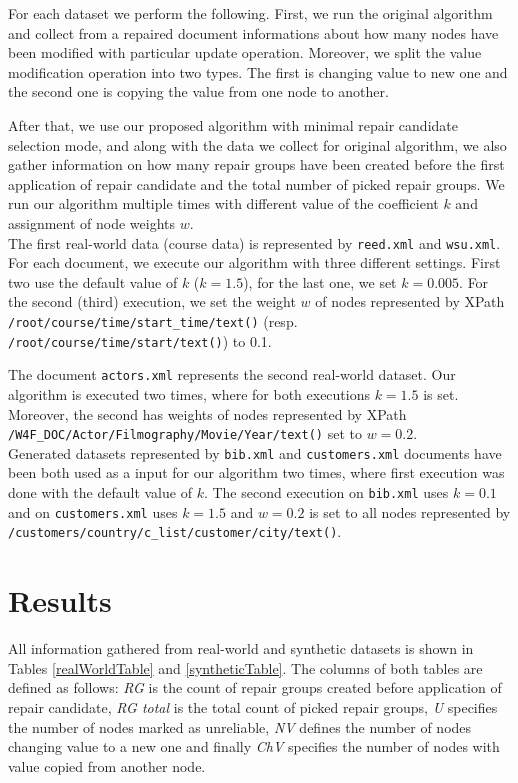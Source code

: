 For each dataset we perform the following. First, we run the original algorithm and collect from a repaired document informations about how many nodes have been modified with particular update operation. Moreover, we split the value modification operation into two types. The first is changing value to new one and the second one is copying the value from one node to another.

After that, we use our proposed algorithm with minimal repair candidate selection mode, and along with the data we collect for original algorithm, we also gather information on how many repair groups have been created before the first application of repair candidate and the total number of picked repair groups. We run our algorithm multiple times with different value of the coefficient $k$ and assignment of node weights $w$.\\

The first real-world data (course data) is represented by \texttt{reed.xml} and \texttt{wsu.xml}. For each document, we execute our algorithm with three different settings. First two use the default value of $k$ ($k=1.5$), for the last one, we set $k=0.005$. For the second (third) execution, we set the weight $w$ of nodes represented by XPath \texttt{/root/course/time/start\_time/text()} (resp. \texttt{/root/course/time/\discretionary{}{}{}start/text()}) to 0.1.

The document \texttt{actors.xml} represents the second real-world dataset. Our algorithm is executed two times, where for both executions $k=1.5$ is set. Moreover, the second has weights of nodes represented by XPath \texttt{/W4F\_DOC/\discretionary{}{}{}Actor/Filmography/Movie/Year/text()} set to $w=0.2$.\\

Generated datasets represented by \texttt{bib.xml} and \texttt{customers.xml} documents have been both used as a input for our algorithm two times, where first execution was done with the default value of $k$. The second execution on \texttt{bib.xml} uses $k=0.1$ and on \texttt{customers.xml} uses $k=1.5$ and $w=0.2$ is set to all nodes represented by \texttt{/customers/country/c\_list/customer/city/text()}.

\section{Results}

All information gathered from real-world and synthetic datasets is shown in Tables \ref{realWorldTable} and \ref{syntheticTable}. The columns of both tables are defined as follows: \emph{RG} is the count of repair groups created before application of repair candidate, \emph{RG total} is the total count of picked repair groups, \emph{U} specifies the number of nodes marked as unreliable, \emph{NV} defines the number of nodes changing value to a new one and finally \emph{ChV} specifies the number of nodes with value copied from another node.\\



